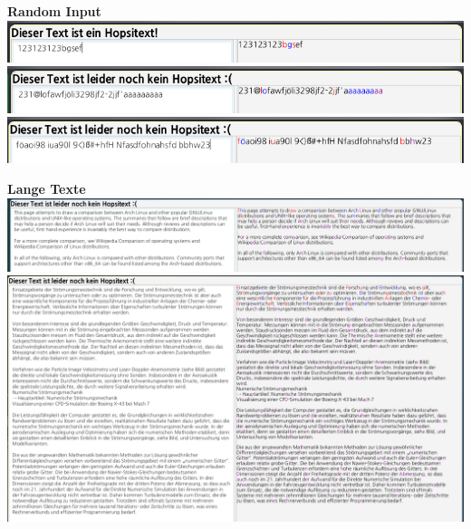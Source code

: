 \documentclass[a4paper,10pt,ngerman]{scrartcl}
\begin{document}
\textbf{Random Input}
\newline
\newline
\includegraphics[scale=0.60]{rand1.png}
\newline
\includegraphics[scale=0.60]{rand2.png}
\newline
\includegraphics[scale=0.60]{rand3.png}
\newline
\newline

\textbf{Lange Texte}
\newline
\newline
\includegraphics[scale=0.35]{lang1.png}
\newline
\newline
\includegraphics[scale=0.35]{lang2.png}

\newpage
\end{document}
